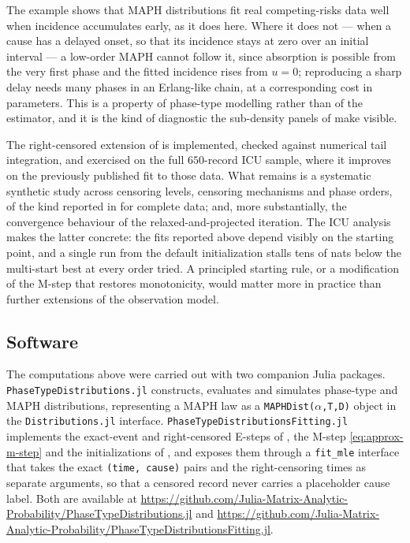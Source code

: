 \documentclass{article}
\newenvironment{rcrevision}{}{}
\newcommand{\aachg}[1]{#1}
\begin{document}
\begin{rcrevision}
The example shows that MAPH distributions fit real competing-risks data well when incidence accumulates early, as it does here. Where it does not --- when a cause has a delayed onset, so that its incidence stays at zero over an initial interval --- a low-order MAPH cannot follow it, since absorption is possible from the very first phase and the fitted incidence rises from $u=0$; reproducing a sharp delay needs many phases in an Erlang-like chain, at a corresponding cost in parameters. This is a property of phase-type modelling rather than of the estimator, and it is the kind of diagnostic \aachg{the sub-density panels of  make visible}.

The right-censored extension of  is implemented, checked against numerical tail integration, and exercised on the full $650$-record ICU sample, where it improves on the previously published fit to those data. What remains is a systematic synthetic study across censoring levels, censoring mechanisms and phase orders, of the kind reported in  for complete data; and, more substantially, the convergence behaviour of the relaxed-and-projected iteration. The ICU analysis makes the latter concrete: the fits reported above depend visibly on the starting point, and a single run from the default initialization stalls tens of nats below the multi-start best at every order tried. A principled starting rule, or a modification of the M-step that restores monotonicity, would matter more in practice than further extensions of the observation model.
\end{rcrevision}

\subsection{Software}
\label{sec:software}

\begin{rcrevision}
The computations above were carried out with two companion \textsf{Julia} packages.
\texttt{PhaseTypeDistributions.jl} constructs, evaluates and simulates phase-type and MAPH
distributions, representing a MAPH law as a \texttt{MAPHDist($\alpha$,T,D)} object in the
\texttt{Distributions.jl} interface. \texttt{PhaseTypeDistributionsFitting.jl} implements the
exact-event and right-censored E-steps of , the M-step
\eqref{eq:approx-m-step} and the initializations of , and exposes them
through a \texttt{fit\_mle} interface that takes the exact \texttt{(time, cause)} pairs and the
right-censoring times as separate arguments, so that a censored record never carries a placeholder
cause label. Both are available at
\url{https://github.com/Julia-Matrix-Analytic-Probability/PhaseTypeDistributions.jl} and
\url{https://github.com/Julia-Matrix-Analytic-Probability/PhaseTypeDistributionsFitting.jl}.
\end{rcrevision}
\end{document}
